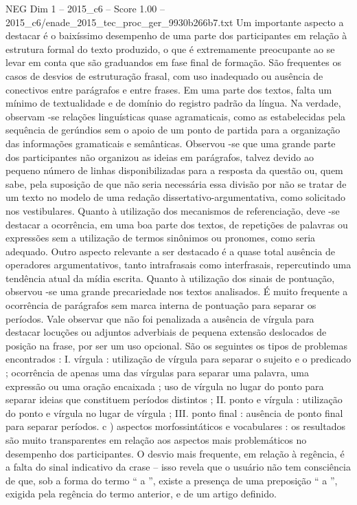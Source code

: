 \begin{textsample}{NEG Dim 1 – 2015\_c6 – Score 1.00 – 2015\_c6/enade\_2015\_tec\_proc\_ger\_9930b266b7.txt}
Um importante aspecto a destacar é o baixíssimo desempenho de uma parte dos participantes em relação à estrutura formal do texto produzido, o que é extremamente preocupante ao se levar em conta que são graduandos em fase final de formação.
São frequentes os casos de desvios de estruturação frasal, com uso inadequado ou ausência de conectivos entre parágrafos e entre frases.
Em uma parte dos textos, falta um mínimo de textualidade e de domínio do registro padrão da língua.
Na verdade, observam -se relações linguísticas quase agramaticais, como as estabelecidas pela sequência de gerúndios sem o apoio de um ponto de partida para a organização das informações gramaticais e semânticas.
Observou -se que uma grande parte dos participantes não organizou as ideias em parágrafos, talvez devido ao pequeno número de linhas disponibilizadas para a resposta da questão ou, quem sabe, pela suposição de que não seria necessária essa divisão por não se tratar de um texto no modelo de uma redação dissertativo-argumentativa, como solicitado nos vestibulares.
Quanto à utilização dos mecanismos de referenciação, deve -se destacar a ocorrência, em uma boa parte dos textos, de repetições de palavras ou expressões sem a utilização de termos sinônimos ou pronomes, como seria adequado.
Outro aspecto relevante a ser destacado é a quase total ausência de operadores argumentativos, tanto intrafrasais como interfrasais, repercutindo uma tendência atual da mídia escrita.
Quanto à utilização dos sinais de pontuação, observou -se uma grande precariedade nos textos analisados.
É muito frequente a ocorrência de parágrafos sem marca interna de pontuação para separar os períodos.
Vale observar que não foi penalizada a ausência de vírgula para destacar locuções ou adjuntos adverbiais de pequena extensão deslocados de posição na frase, por ser um uso opcional.
São os seguintes os tipos de problemas encontrados : I. vírgula : utilização de vírgula para separar o sujeito e o predicado ; ocorrência de apenas uma das vírgulas para separar uma palavra, uma expressão ou uma oração encaixada ; uso de vírgula no lugar do ponto para separar ideias que constituem períodos distintos ; II. ponto e vírgula : utilização do ponto e vírgula no lugar de vírgula ; III. ponto final : ausência de ponto final para separar períodos. c ) aspectos morfossintáticos e vocabulares : os resultados são muito transparentes em relação aos aspectos mais problemáticos no desempenho dos participantes.
O desvio mais frequente, em relação à regência, é a falta do sinal indicativo da crase – isso revela que o usuário não tem consciência de que, sob a forma do termo “ a ”, existe a presença de uma preposição “ a ”, exigida pela regência do termo anterior, e de um artigo definido.

\end{textsample}
